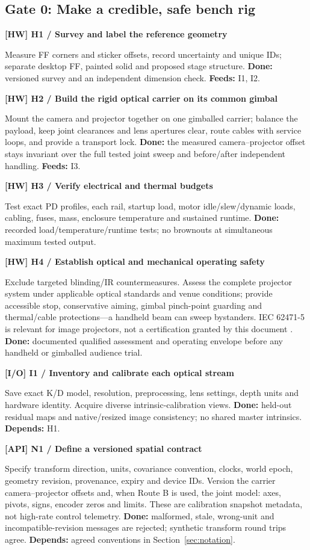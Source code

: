 \documentclass[11pt,a4paper]{article}
\newcommand{\task}[4]{%
  \begin{tcolorbox}[colback=#1!5,colframe=#1,boxrule=0.5pt,
    borderline west={2pt}{0pt}{#1}]
  \textcolor{#1}{\textbf{[#2] #3}}\par #4
  \end{tcolorbox}}
\begin{document}
\subsection{Gate 0: Make a credible, safe bench rig}
\task{HW}{HW}{H1 / Survey and label the reference geometry}{
Measure FF corners and sticker offsets, record uncertainty and unique IDs;
separate desktop FF, painted solid and proposed stage structure.
\textbf{Done:} versioned survey and an independent dimension check.
\textbf{Feeds:} I1, I2.}
\task{HW}{HW}{H2 / Build the rigid optical carrier on its common gimbal}{
Mount the camera and projector together on one gimballed carrier;
balance the payload, keep joint clearances and lens apertures clear,
route cables with service loops, and provide a transport lock.
\textbf{Done:} the measured camera--projector offset stays invariant over
the full tested joint sweep and before/after independent handling.
\textbf{Feeds:} I3.}
\task{HW}{HW}{H3 / Verify electrical and thermal budgets}{
Test exact PD profiles, each rail, startup load, motor idle/slew/dynamic
loads, cabling, fuses, mass, enclosure temperature and sustained runtime.
\textbf{Done:} recorded load/temperature/runtime tests; no brownouts at
simultaneous maximum tested output.}
\task{HW}{HW}{H4 / Establish optical and mechanical operating safety}{
Exclude targeted blinding/IR countermeasures. Assess the complete projector
system under applicable optical standards and venue conditions; provide
accessible stop, conservative aiming, gimbal pinch-point guarding and
thermal/cable protections---a handheld beam can sweep bystanders.
IEC 62471-5 is relevant for image projectors, not a certification granted
by this document \cite{iec}.
\textbf{Done:} documented qualified assessment and operating envelope before
any handheld or gimballed audience trial.}
\task{IO}{I/O}{I1 / Inventory and calibrate each optical stream}{
Save exact K/D model, resolution, preprocessing, lens settings, depth units
and hardware identity. Acquire diverse intrinsic-calibration views.
\textbf{Done:} held-out residual maps and native/resized image consistency;
no shared master intrinsics. \textbf{Depends:} H1.}
\task{API}{API}{N1 / Define a versioned spatial contract}{
Specify transform direction, units, covariance convention, clocks, world
epoch, geometry revision, provenance, expiry and device IDs. Version the
carrier camera--projector offsets and, when Route B is used, the joint
model: axes, pivots, signs, encoder zeros and limits. These are
calibration snapshot metadata, not high-rate control telemetry.
\textbf{Done:} malformed, stale, wrong-unit and incompatible-revision
messages are rejected; synthetic transform round trips agree.
\textbf{Depends:} agreed conventions in Section~\ref{sec:notation}.}
\end{document}
